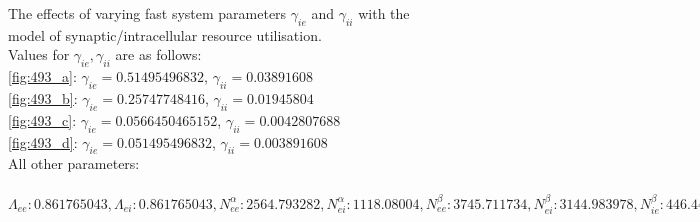 \documentclass[a4paper,12pt]{article}
\begin{document}
\begin{figure}
	\label{fig:intra_gamma}
	\caption{The effects of varying fast system parameters $\gamma_{ie}$ and $\gamma_{ii}$ with the model of synaptic/intracellular resource utilisation. \\
	Values for $\gamma_{ie}, \gamma_{ii}$ are as follows: \\
\ref{fig:493_a}: $\gamma_{ie}=0.51495496832$, $\gamma_{ii}=0.03891608$ \\
\ref{fig:493_b}: $\gamma_{ie}=0.25747748416$, $\gamma_{ii}=0.01945804$ \\
\ref{fig:493_c}: $\gamma_{ie}=0.0566450465152$, $\gamma_{ii}=0.0042807688$ \\
\ref{fig:493_d}: $\gamma_{ie}=0.051495496832$, $\gamma_{ii}=0.003891608$ \\
All other parameters:\\ \\
$\Lambda_{ee}: 0.861765043, \Lambda_{ei}: 0.861765043, N^{\alpha}_{ee}: 2564.793282, N^{\alpha}_{ei}: 1118.08004, N^{\beta}_{ee}: 3745.711734, N^{\beta}_{ei}: 3144.983978, N^{\beta}_{ie}: 446.4477283, N^{\beta}_{ii}: 345.8866865, \Gamma_{ee}: 1.6861042005, \Gamma_{ei}: 1.885871361, \hat{\Gamma_{ie}}: 5.855116285, \hat{\Gamma_{ii}}: 6.9331585350000005, g: 0.7, \gamma_{ee}: 0.95083473, \gamma_{ei}: 0.79156622, \chi_{ee}: 700.0, \chi_{ei}: 700.0, h^{rest}_e: -79.61058688, h^{eq}_{ee}: -17.9914286, h^{eq}_{ei}: -15.53827744, h^{rest}_i: -71.24328917, h^{eq}_{ie}: -84.00936425, h^{eq}_{ii}: -89.797995, \mu_e: -41.12042539, \mu_i: -54.45064422, p_{ee}: 2.6864898634, p_{ei}: 6.648040185, p_{ie}: 0.0, p_{ii}: 0.0, \phi_{ie}: 0, \phi_{ii}: 0, r^{abs}: 0.0, S^{max}_e: 0.400558, S^{max}_i: 0.404191, \sigma_e: 6.55747395, \sigma_i: 2.047597811, \tau_e: 108.758, \tau_i: 232.0, \tau^{slow}_e: 5437.9, v: 0.419426$
}
\end{figure}
\end{document}
